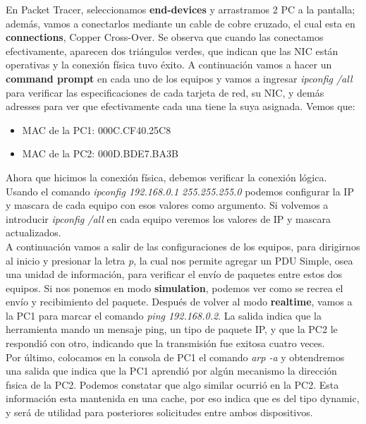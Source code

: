 \documentclass{article}
\begin{document}
{\setlength{\parindent}{1pt}En Packet Tracer, seleccionamos \textbf{end-devices} y arrastramos 2 PC a la pantalla; además, vamos a conectarlos mediante un cable de cobre cruzado, el cual esta en \textbf{connections}, Copper Cross-Over. Se observa que cuando las conectamos efectivamente, aparecen dos triángulos verdes, que indican que las NIC están operativas y la conexión física tuvo éxito. A continuación vamos a hacer un \textbf{command prompt} en cada uno de los equipos y vamos a ingresar \textit{ipconfig /all} para verificar las especificaciones de cada tarjeta de red, su NIC, y demás adresses para ver que efectivamente cada una tiene la suya asignada. Vemos que: 

\begin{itemize}
    \item MAC de la PC1: 000C.CF40.25C8
    \item MAC de la PC2: 000D.BDE7.BA3B
\end{itemize} 

Ahora que hicimos la conexión física, debemos verificar la conexión lógica. Usando el comando \textit{ipconfig 192.168.0.1 255.255.255.0} podemos configurar la IP y mascara de cada equipo con esos valores como argumento. Si volvemos a introducir \textit{ipconfig /all} en cada equipo veremos los valores de IP y mascara actualizados. \\

A continuación vamos a salir de las configuraciones de los equipos, para dirigirnos al inicio y presionar la letra \textit{p}, la cual nos permite agregar un PDU Simple, osea una unidad de información, para verificar el envío de paquetes entre estos dos equipos. Si nos ponemos en modo \textbf{simulation}, podemos ver como se recrea el envío y recibimiento del paquete. Después de volver al modo \textbf{realtime}, vamos a la PC1 para marcar el comando \textit{ping 192.168.0.2}. La salida indica que la herramienta mando un mensaje ping, un tipo de paquete IP, y que la
 PC2 le respondió con otro, indicando que la transmisión fue exitosa cuatro veces. \\

 Por último, colocamos en la consola de PC1 el comando \textit{arp -a} y obtendremos una salida que indica que la PC1 aprendió por algún mecanismo la dirección fısica de la PC2. Podemos constatar que algo similar ocurrió en la PC2. Esta información esta mantenida en una cache, por eso indica que es del tipo dynamic, y será de utilidad para posteriores solicitudes entre ambos dispositivos.}
\end{document}
